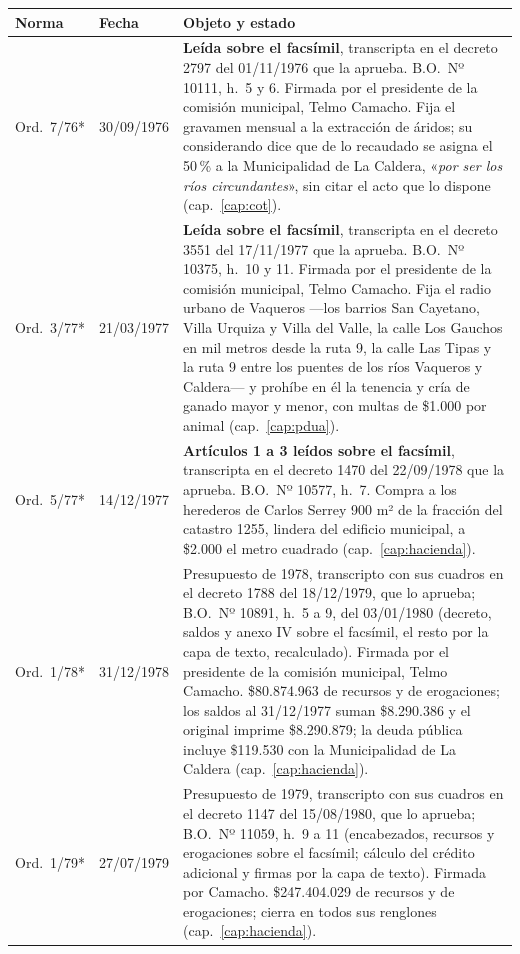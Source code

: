 \begin{longtable}{@{}p{3.2cm}p{1.9cm}p{7.9cm}@{}}
\toprule
\textbf{Norma} & \textbf{Fecha} & \textbf{Objeto y estado} \\
\midrule
\endhead
Ord.\ 7/76* & 30/09/1976 & \textbf{Leída sobre el facsímil}, transcripta en el decreto 2797 del 01/11/1976 que la aprueba. B.O.\ Nº 10111, h.\ 5 y 6. Firmada por el presidente de la comisión municipal, Telmo Camacho. Fija el gravamen mensual a la extracción de áridos; su considerando dice que de lo recaudado se asigna el 50\,\% a la Municipalidad de La Caldera, «\textit{por ser los ríos circundantes}», sin citar el acto que lo dispone (cap.\ \ref{cap:cot}). \\
Ord.\ 3/77* & 21/03/1977 & \textbf{Leída sobre el facsímil}, transcripta en el decreto 3551 del 17/11/1977 que la aprueba. B.O.\ Nº 10375, h.\ 10 y 11. Firmada por el presidente de la comisión municipal, Telmo Camacho. Fija el radio urbano de Vaqueros ---los barrios San Cayetano, Villa Urquiza y Villa del Valle, la calle Los Gauchos en mil metros desde la ruta 9, la calle Las Tipas y la ruta 9 entre los puentes de los ríos Vaqueros y Caldera--- y prohíbe en él la tenencia y cría de ganado mayor y menor, con multas de \$1.000 por animal (cap.\ \ref{cap:pdua}). \\
Ord.\ 5/77* & 14/12/1977 & \textbf{Artículos 1 a 3 leídos sobre el facsímil}, transcripta en el decreto 1470 del 22/09/1978 que la aprueba. B.O.\ Nº 10577, h.\ 7. Compra a los herederos de Carlos Serrey 900 m² de la fracción del catastro 1255, lindera del edificio municipal, a \$2.000 el metro cuadrado (cap.\ \ref{cap:hacienda}). \\
Ord.\ 1/78* & 31/12/1978 & Presupuesto de 1978, transcripto con sus cuadros en el decreto 1788 del 18/12/1979, que lo aprueba; B.O.\ Nº 10891, h.\ 5 a 9, del 03/01/1980 (decreto, saldos y anexo IV sobre el facsímil, el resto por la capa de texto, recalculado). Firmada por el presidente de la comisión municipal, Telmo Camacho. \$80.874.963 de recursos y de erogaciones; los saldos al 31/12/1977 suman \$8.290.386 y el original imprime \$8.290.879; la deuda pública incluye \$119.530 con la Municipalidad de La Caldera (cap.\ \ref{cap:hacienda}). \\
Ord.\ 1/79* & 27/07/1979 & Presupuesto de 1979, transcripto con sus cuadros en el decreto 1147 del 15/08/1980, que lo aprueba; B.O.\ Nº 11059, h.\ 9 a 11 (encabezados, recursos y erogaciones sobre el facsímil; cálculo del crédito adicional y firmas por la capa de texto). Firmada por Camacho. \$247.404.029 de recursos y de erogaciones; cierra en todos sus renglones (cap.\ \ref{cap:hacienda}). \\

\end{longtable}
